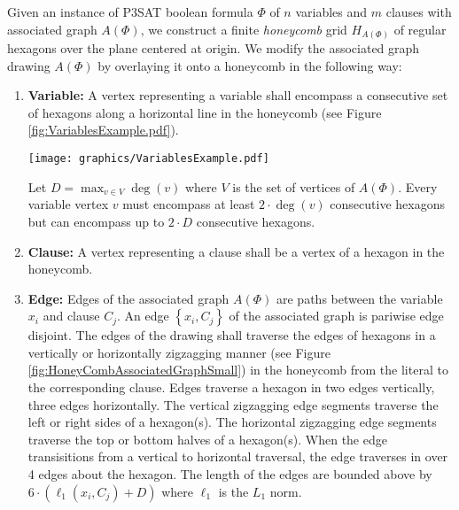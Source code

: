 \documentclass[10pt]{CSUNthesis}
\theoremstyle{plain}%
\theoremstyle{definition}
\theoremstyle{remark}
\newcommand{\lr}[1]{\left( #1 \right)}
\begin{document}
Given an instance of P3SAT boolean formula $\Phi$ of $n$ variables and $m$ clauses with associated graph $A(\Phi)$, we construct a finite \textit{honeycomb} grid $H_{A \lr{\Phi}}$ of regular hexagons over the plane centered at origin.
We modify the associated graph drawing $A\lr{\Phi}$ by overlaying it onto a honeycomb in the following way:

\begin{enumerate}
\item \textbf{Variable:} A vertex representing a variable shall encompass a consecutive set of hexagons along a horizontal line in the honeycomb (see Figure \ref{fig:VariablesExample.pdf}).

\begin{minipage}{\linewidth}
\begin{center}
\texttt{[image: graphics/VariablesExample.pdf]}
\label{fig:VariablesExample.pdf}
\end{center}
\end{minipage}

Let $D = \max_{v \in V} \deg(v)$ where $V$ is the set of vertices of $A(\Phi)$.
Every variable vertex $v$  must encompass at least $2 \cdot \deg(v)$ consecutive hexagons but can encompass up to $2 \cdot D$ consecutive hexagons.
\item \textbf{Clause:} A vertex representing a clause shall be a vertex of a hexagon in the honeycomb.
\item \textbf{Edge:} Edges of the associated graph $A(\Phi)$ are paths between the variable $x_i$ and clause $C_j$.  An edge $\left\lbrace x_i, C_j \right\rbrace$ of the associated graph is pariwise edge disjoint. 
The edges of the drawing shall traverse the edges of hexagons in a vertically or horizontally zigzagging manner (see Figure \ref{fig:HoneyCombAssociatedGraphSmall}) in the honeycomb from the literal to the corresponding clause. 
Edges traverse a hexagon in two edges vertically, three edges horizontally.  
The vertical zigzagging edge segments traverse the left or right sides of a hexagon(s).
The horizontal zigzagging edge segments traverse the top or bottom halves of a hexagon(s).
When the edge transisitions from a vertical to horizontal traversal, the edge traverses in over 4 edges about the hexagon.
The length of the edges are bounded above by $6 \cdot \lr{\ell_1 \lr{x_i,C_j} + D}$ where $\ell_1$ is the $L_1$ norm. 
\end{enumerate}
\end{document}

